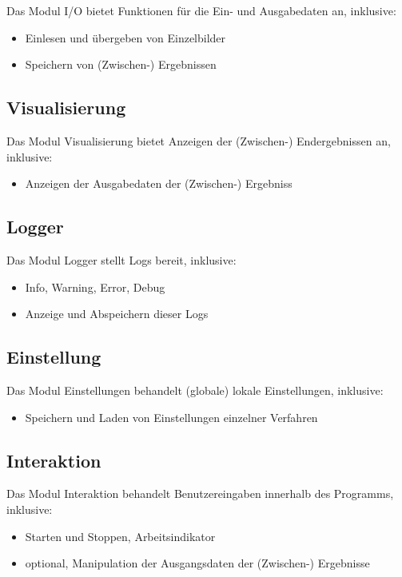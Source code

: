 Das Modul I/O bietet Funktionen für die Ein- und Ausgabedaten an, inklusive:

\begin{itemize}
\item Einlesen und übergeben von Einzelbilder
\item Speichern von (Zwischen-) Ergebnissen
\end{itemize}

\subsection{Visualisierung}
Das Modul Visualisierung bietet Anzeigen der (Zwischen-) Endergebnissen  an, inklusive:

\begin{itemize}
\item Anzeigen der Ausgabedaten der (Zwischen-) Ergebniss
\end{itemize}

\subsection{Logger}
Das Modul Logger stellt Logs bereit, inklusive:

\begin{itemize}
\item Info, Warning, Error, Debug
\item Anzeige und Abspeichern dieser Logs
\end{itemize}

\subsection{Einstellung}
Das Modul Einstellungen behandelt (globale) lokale Einstellungen, inklusive:

\begin{itemize}
\item Speichern und Laden von Einstellungen einzelner Verfahren
\end{itemize}

\subsection{Interaktion}
Das Modul Interaktion behandelt Benutzereingaben innerhalb des Programms, inklusive:

\begin{itemize}
\item Starten und Stoppen, Arbeitsindikator 
\item optional, Manipulation der Ausgangsdaten der (Zwischen-) Ergebnisse
\end{itemize}

